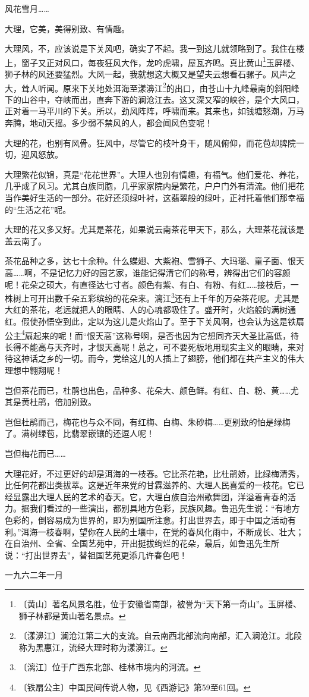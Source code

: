 \documentclass[12pt,UTF-8,openany]{ctexbook}
\begin{document}
\begin{normalsize}
    风花雪月……
    
    大理，它美，美得别致、有情趣。
    
    大理风，不，应该说是下关风吧，确实了不起。我一到这儿就领略到了。我住在楼上，窗子又正对风口，每夜狂风大作，龙吟虎啸，屋瓦齐鸣。真比黄山\footnote{〔黄山〕著名风景名胜，位于安徽省南部，被誉为“天下第一奇山”。玉屏楼、狮子林都是黄山著名景点。}玉屏楼、狮子林的风还要猛烈。大风一起，我就想这大概又是望夫云想看石骡子。风声之大，耸人听闻。原来下关地处洱海至漾濞江\footnote{〔漾濞江〕澜沧江第二大的支流。自云南西北部流向南部，汇入澜沧江。北段称为黑惠江，流经大理时称为漾濞江。}的出口，由苍山十九峰最南的斜阳峰下的山谷中，夺峡而出，直奔下游的澜沧江去。这又深又窄的峡谷，是个大风口，正对着一马平川的下关。所以，劲风阵阵，呼啸而来。其来也，如钱塘怒潮，万马奔腾，地动天摇。多少弱不禁风的人，都会闻风色变呢！
    
    大理的花，也别有风骨。狂风中，尽管它的枝叶身干，随风俯仰，而花苞却脾院一切，迎风怒放。
    
    大理繁花似锦，真是“花花世界”。大理人也别有情趣，有福气。他们爱花、养花，几乎成了风习。尤其白族同胞，几乎家家院内是繁花，户户门外有清流。他们把花当作美好生活的一部分。花好还须绿叶衬，这翡翠般的绿叶，正衬托着他们那幸福的“生活之花”呢。
    
    大理的花又多又好。尤其是茶花，如果说云南茶花甲天下，那么，大理茶花就该是盖云南了。
    
    茶花品种之多，达七十余种。什么蝶翅、大紫袍、雪狮子、大玛瑙、童子面、恨天高……啊，不是记忆力好的园艺家，谁能记得清它们的称号，辨得出它们的容颜呢！花朵之硕大，有直径达七寸者。颜色有紫、有白、有粉、有红……接枝后，一株树上可开出数千朵五彩缤纷的花朵来。漓江\footnote{〔漓江〕位于广西东北部、桂林市境内的河流。}还有上千年的万朵茶花呢。尤其是大红的茶花，老远就把人的眼睛、人的心魂都吸住了。盛开时，火焰般的满树通红。假使孙悟空到此，定以为这儿是火焰山了。至于下关风啊，也会认为这是铁扇公主\footnote{〔铁扇公主〕中国民间传说人物，见《西游记》第59至61回。}扇起来的呢！而“恨天高”这称号啊，是否也因为它想同齐天大圣比高低，待长得不能高与天齐时，才恨天高呢！总之，可不要死板地用现实主义的眼睛，来对待这神话之乡的一切。而今，党给这儿的人插上了翅膀，他们都在共产主义的伟大理想中翱翔呢！
    
    岂但茶花而已，杜鹃也出色，品种多、花朵大、颜色鲜。有红、白、粉、黄……尤其是黄杜鹃，倍加别致。
    
    岂但杜鹃而己，梅花也与众不同，有红梅、白梅、朱砂梅……更别致的怕是绿梅了。满树绿苞，比翡翠嵌镶的还逗人呢！
    
    岂但梅花而已……
    
    大理花好，不过更好的却是洱海的一枝春。它比茶花艳，比杜鹃娇，比绿梅清秀，比任何花都出类拔萃。这是近年来党的甘霖滋养的、大理人民喜爱的一枝花。它已经显露出大理人民的艺术的春天。它，大理白族自治州歌舞团，洋溢着青春的活力。据我们看过的一些演出，都别具地方色彩，民族风趣。鲁迅先生说：“有地方色彩的，倒容易成为世界的，即为别国所注意。打出世界去，即于中国之活动有利。”洱海一枝春啊，望你在人民的土壤中，在党的春风化雨中，不断成长、壮大；在自治州、全省、全国艺苑中，开出挺拔绚烂的花朵，最后，如鲁迅先生所说：“打出世界去”，替祖国艺苑更添几许春色吧！
    
    \hfill 一九六二年一月
    
\end{normalsize}
\end{document}
